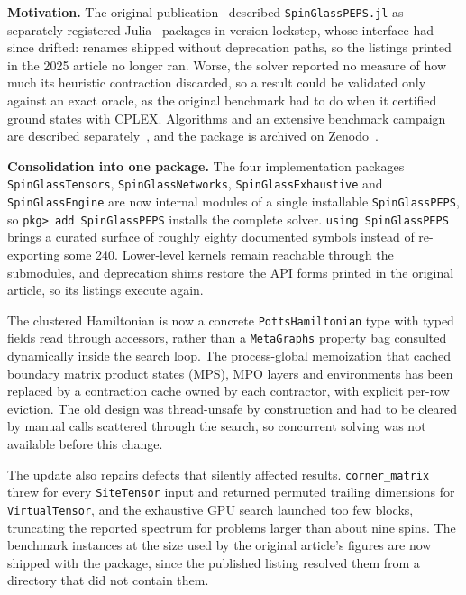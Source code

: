 \documentclass[preprint,12pt,a4paper]{elsarticle}
\begin{document}
\textbf{Motivation.} The original publication~\cite{smierzchalski2025spinglasspeps}
described \texttt{SpinGlassPEPS.jl} as separately registered
Julia~\cite{bezanson2017julia} packages in version lockstep, whose interface had
since drifted: renames shipped without deprecation paths, so the listings printed
in the 2025 article no longer ran. Worse, the solver reported no measure of how
much its heuristic contraction discarded, so a result could be validated only
against an exact oracle, as the original benchmark had to do when it certified
ground states with CPLEX. Algorithms and an extensive benchmark
campaign are described separately~\cite{dziubyna2024limitations}, and the package
is archived on Zenodo~\cite{spinglasspeps_zenodo}.

\textbf{Consolidation into one package.} The four implementation packages
\texttt{SpinGlassTensors}, \texttt{SpinGlassNetworks},
\texttt{SpinGlassExhaustive} and \texttt{SpinGlassEngine} are now internal modules
of a single installable \texttt{SpinGlassPEPS}, so \texttt{pkg> add SpinGlassPEPS}
installs the complete solver. \texttt{using SpinGlassPEPS} brings a curated surface
of roughly eighty documented symbols instead of re-exporting some 240. Lower-level
kernels remain reachable through the submodules, and deprecation shims restore the
API forms printed in the original article, so its listings execute again.

The clustered Hamiltonian is now a concrete \texttt{PottsHamiltonian} type with
typed fields read through accessors, rather than a \texttt{MetaGraphs} property bag
consulted dynamically inside the search loop. The process-global memoization that
cached boundary matrix product states (MPS), MPO layers and environments has been
replaced by a contraction cache owned by each contractor, with explicit per-row
eviction. The old design was thread-unsafe by construction and had to be cleared by
manual calls scattered through the search, so concurrent solving was not available
before this change.

The update also repairs defects that silently affected results.
\texttt{corner\_matrix} threw for every \texttt{SiteTensor} input and returned
permuted trailing dimensions for \texttt{VirtualTensor}, and the exhaustive GPU
search launched too few blocks,
truncating the reported spectrum for problems larger than about nine spins. The
benchmark instances at the size used by the original article's figures are now
shipped with the package, since the published listing resolved them from a directory
that did not contain them.
\end{document}
